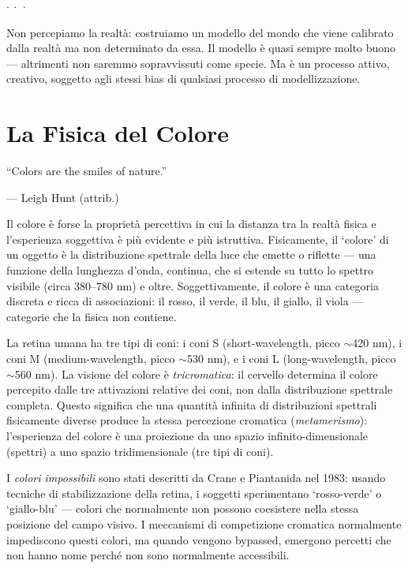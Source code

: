 \documentclass[12pt,a4paper,openany]{book}
\newcommand{\sezione}[1]{\vspace{1.2em}{\large\bfseries #1}\vspace{0.5em}\par}
\newcommand{\puntini}{\begin{center}$\cdot\ \cdot\ \cdot$\end{center}\vspace{0.3em}}
\begin{document}
\puntini

Non percepiamo la realtà: costruiamo un modello del mondo che viene calibrato dalla realtà ma non determinato da essa. Il modello è quasi sempre molto buono — altrimenti non saremmo sopravvissuti come specie. Ma è un processo attivo, creativo, soggetto agli stessi bias di qualsiasi processo di modellizzazione.

\chapter{La Fisica del Colore}

\epigraph{``Colors are the smiles of nature.''}{--- Leigh Hunt (attrib.)}

\sezione{Luce e colore: due descrizioni incompatibili}

Il colore è forse la proprietà percettiva in cui la distanza tra la realtà fisica e l'esperienza soggettiva è più evidente e più istruttiva. Fisicamente, il `colore' di un oggetto è la distribuzione spettrale della luce che emette o riflette --- una funzione della lunghezza d'onda, continua, che si estende su tutto lo spettro visibile (circa 380--780 nm) e oltre. Soggettivamente, il colore è una categoria discreta e ricca di associazioni: il rosso, il verde, il blu, il giallo, il viola --- categorie che la fisica non contiene.

La retina umana ha tre tipi di coni: i coni S (short-wavelength, picco $\sim$420 nm), i coni M (medium-wavelength, picco $\sim$530 nm), e i coni L (long-wavelength, picco $\sim$560 nm). La visione del colore è \textit{tricromatica}: il cervello determina il colore percepito dalle tre attivazioni relative dei coni, non dalla distribuzione spettrale completa. Questo significa che una quantità infinita di distribuzioni spettrali fisicamente diverse produce la stessa percezione cromatica (\textit{metamerismo}): l'esperienza del colore è una proiezione da uno spazio infinito-dimensionale (spettri) a uno spazio tridimensionale (tre tipi di coni).

\sezione{I colori impossibili}

I \textit{colori impossibili} sono stati descritti da Crane e Piantanida nel 1983: usando tecniche di stabilizzazione della retina, i soggetti sperimentano `rosso-verde' o `giallo-blu' --- colori che normalmente non possono coesistere nella stessa posizione del campo visivo. I meccanismi di competizione cromatica normalmente impediscono questi colori, ma quando vengono bypassed, emergono percetti che non hanno nome perché non sono normalmente accessibili.
\end{document}
